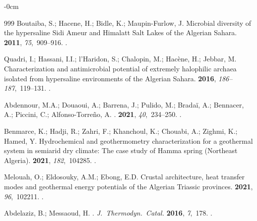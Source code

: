 \documentclass[asi,article,accept,pdftex,moreauthors]{Definitions/mdpi}
\begin{document}
\begin{adjustwidth}{-\extralength}{0cm}
\begin{thebibliography}{999}
Boutaiba, S.; Hacene, H.; Bidle, K.; Maupin-Furlow, J.
\newblock Microbial diversity of the hypersaline Sidi Ameur and Himalatt Salt
  Lakes of the Algerian Sahara.
 {\bf 2011}, {\em 75},~909--916.
.

Quadri, I.; Hassani, I.I.; l’Haridon, S.; Chalopin, M.; Hacène, H.; Jebbar,
  M.
\newblock Characterization and antimicrobial potential of extremely halophilic
  archaea isolated from hypersaline environments of the Algerian Sahara.
 {\bf 2016}, {\em \mbox{186--187}},\mbox{~119--131.}
.

Abdennour, M.A.; Douaoui, A.; Barrena, J.; Pulido, M.; Bradaï, A.; Bennacer,
  A.; Piccini, C.; Alfonso-Torreño, A.
.
 {\bf 2021}, {\em 40},~234--250.
\mbox{.}

Benmarce, K.; Hadji, R.; Zahri, F.; Khanchoul, K.; Chouabi, A.; Zighmi, K.;
  Hamed, Y.
\newblock Hydrochemical and geothermometry characterization for a geothermal
  system in semiarid dry climate: The case study of Hamma spring (Northeast
  Algeria).
 {\bf 2021}, {\em
  182},~104285.
.

Melouah, O.; Eldosouky, A.M.; Ebong, E.D.
\newblock Crustal architecture, heat transfer modes and geothermal energy
  potentials of the Algerian Triassic provinces.
 {\bf 2021}, {\em 96},~102211.
.

Abdelaziz, B.; Messaoud, H.
.
\newblock \mbox{{\em J. Thermodyn. Catal.}} {\bf 2016}, {\em
  7},~178.
.


\end{thebibliography}
\end{adjustwidth}
\end{document}
